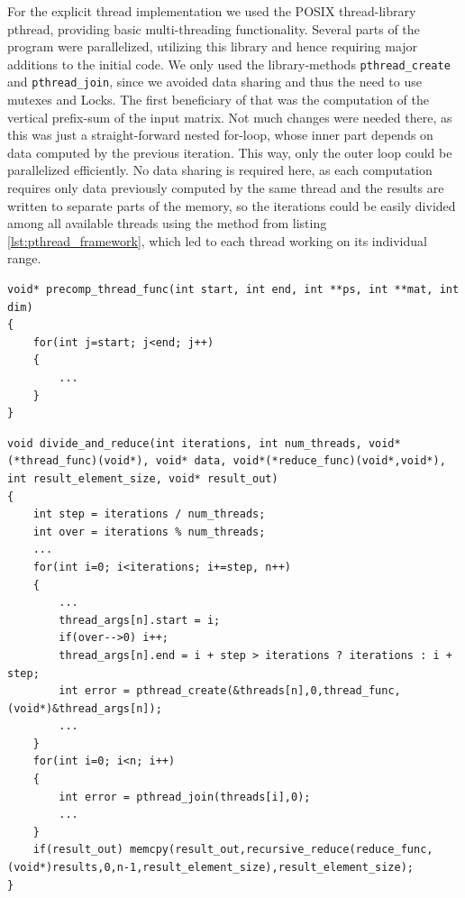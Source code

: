 \documentclass[conference]{IEEEtran}
\begin{document}
For the explicit thread implementation we used the POSIX thread-library pthread, providing basic multi-threading functionality. Several parts of the program were parallelized, utilizing this library and hence requiring major additions to the initial code. We only used the library-methods \texttt{pthread\_create} and \texttt{pthread\_join}, since we avoided data sharing and thus the need to use mutexes and Locks.
The first beneficiary of that was the computation of the vertical prefix-sum of the input matrix. Not much changes were needed there, as this was just a straight-forward nested for-loop, whose inner part depends on data computed by the previous iteration. This way, only the outer loop could be parallelized efficiently. No data sharing is required here, as each computation requires only data previously computed by the same thread and the results are written to separate parts of the memory, so the iterations could be easily divided among all available threads using the method from listing \ref{lst:pthread_framework}, which led to each thread working on its individual range.

\begin{center}
   \begin{lstlisting}[captionpos=b, caption=pthread: Parallel Matrix Pre-Computation of the Vertical Sum (simplified) - the variables \texttt{start} and \texttt{end} are used to equally divide the work among all available threads and to specify where the work of a thread begins and ends., label=lst:pthread_precomp]
void* precomp_thread_func(int start, int end, int **ps, int **mat, int dim)
{
    for(int j=start; j<end; j++)
    {
		...
    }
}
   \end{lstlisting}
\end{center}

\begin{center}
   \begin{lstlisting}[captionpos=b, caption=pthread: Framework used for dividing iterations among a fixed number of threads and reducing the results afterwards, label=lst:pthread_framework]
void divide_and_reduce(int iterations, int num_threads, void*(*thread_func)(void*), void* data, void*(*reduce_func)(void*,void*), int result_element_size, void* result_out)
{
    int step = iterations / num_threads;
    int over = iterations % num_threads;
    ...
    for(int i=0; i<iterations; i+=step, n++)
    {
        ...
        thread_args[n].start = i;
        if(over-->0) i++;
        thread_args[n].end = i + step > iterations ? iterations : i + step;
        int error = pthread_create(&threads[n],0,thread_func,(void*)&thread_args[n]);
        ...
    }
    for(int i=0; i<n; i++)
    {
        int error = pthread_join(threads[i],0);
        ...
    }
    if(result_out) memcpy(result_out,recursive_reduce(reduce_func,(void*)results,0,n-1,result_element_size),result_element_size);
}
   \end{lstlisting}
\end{center}
\end{document}
